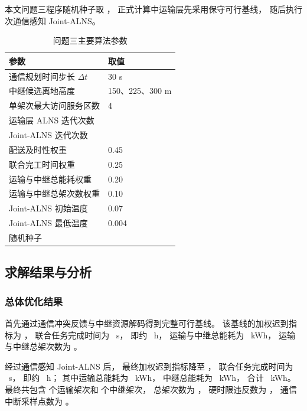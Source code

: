本文问题三程序随机种子取 \QThreeSeed，
正式计算中运输层先采用保守可行基线，
随后执行 \QThreeJointIter 次通信感知 Joint-ALNS。

\begin{table}[htbp]
	\centering
	\caption{问题三主要算法参数}
	\label{tab:q3-parameters}
	\begin{tabularx}{0.90\linewidth}{Y Y}
		\toprule
		参数 & 取值 \\
		\midrule
		通信规划时间步长 $\Delta t$ & 30 s \\
		中继候选离地高度 & 150、225、300 m \\
		单架次最大访问服务区数 & 4 \\
		运输层 ALNS 迭代次数 & \QThreeTransportIter \\
		Joint-ALNS 迭代次数 & \QThreeJointIter \\
		配送及时性权重 & 0.45 \\
		联合完工时间权重 & 0.25 \\
		运输与中继总能耗权重 & 0.20 \\
		运输与中继总架次数权重 & 0.10 \\
		Joint-ALNS 初始温度 & 0.07 \\
		Joint-ALNS 最低温度 & 0.004 \\
		随机种子 & \QThreeSeed \\
		\bottomrule
	\end{tabularx}
\end{table}
\FloatBarrier

\subsection{求解结果与分析}

\subsubsection{总体优化结果}

首先通过通信冲突反馈与中继资源解码得到完整可行基线。
该基线的加权迟到指标为 \QThreeBaseLate，
联合任务完成时间为 \QThreeBaseMakespan~s，
即约 \QThreeBaseMakespanHour~h，
运输与中继总能耗为 \QThreeBaseEnergy~kWh，
运输与中继总架次数为 \QThreeBaseTrips。

经过通信感知 Joint-ALNS 后，
最终加权迟到指标降至 \QThreeLate，
联合任务完成时间为 \QThreeMakespan~s，
即约 \QThreeMakespanHour~h；
其中运输总能耗为 \QThreeTransportEnergy~kWh，
中继总能耗为 \QThreeRelayEnergy~kWh，
合计 \QThreeEnergy~kWh。
最终共包含 \QThreeTransportTrips 个运输架次和 \QThreeRelayTrips 个中继架次，
总架次数为 \QThreeTrips，
硬时限违反数为 \QThreeHardViolation，
通信中断采样点数为 \QThreeCommOutage。

